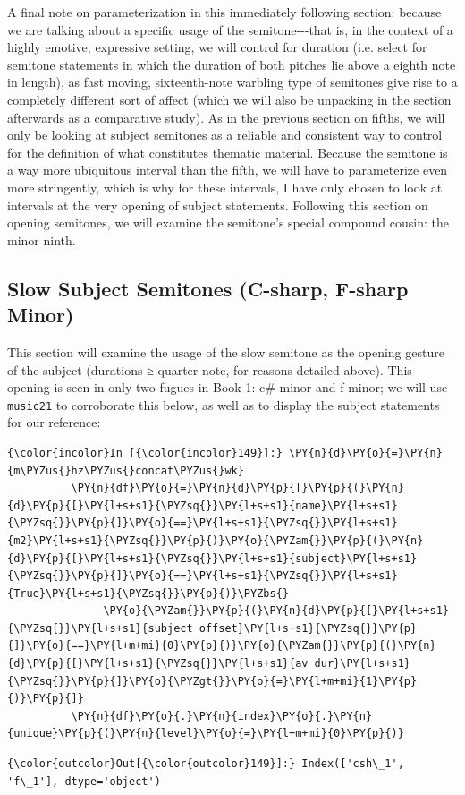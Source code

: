 A final note on parameterization in this immediately following section:
because we are talking about a specific usage of the semitone-\/-\/-that
is, in the context of a highly emotive, expressive setting, we will
control for duration (i.e. select for semitone statements in which the
duration of both pitches lie above a eighth note in length), as fast
moving, sixteenth-note warbling type of semitones give rise to a
completely different sort of affect (which we will also be unpacking in
the section afterwards as a comparative study). As in the previous
section on fifths, we will only be looking at subject semitones as a
reliable and consistent way to control for the definition of what
constitutes thematic material. Because the semitone is a way more
ubiquitous interval than the fifth, we will have to parameterize even
more stringently, which is why for these intervals, I have only chosen
to look at intervals at the very opening of subject statements.
Following this section on opening semitones, we will examine the
semitone's special compound cousin: the minor ninth.

    \subsection{Slow Subject Semitones (C-sharp, F-sharp
Minor)}\label{slow-subject-semitones-c-sharp-f-sharp-minor}

This section will examine the usage of the slow semitone as the opening
gesture of the subject (durations ≥ quarter note, for reasons detailed
above). This opening is seen in only two fugues in Book 1: c\# minor and
f minor; we will use \texttt{music21} to corroborate this below, as well
as to display the subject statements for our reference:

    \begin{Verbatim}[commandchars=\\\{\}]
{\color{incolor}In [{\color{incolor}149}]:} \PY{n}{d}\PY{o}{=}\PY{n}{m\PYZus{}hz\PYZus{}concat\PYZus{}wk}
          \PY{n}{df}\PY{o}{=}\PY{n}{d}\PY{p}{[}\PY{p}{(}\PY{n}{d}\PY{p}{[}\PY{l+s+s1}{\PYZsq{}}\PY{l+s+s1}{name}\PY{l+s+s1}{\PYZsq{}}\PY{p}{]}\PY{o}{==}\PY{l+s+s1}{\PYZsq{}}\PY{l+s+s1}{m2}\PY{l+s+s1}{\PYZsq{}}\PY{p}{)}\PY{o}{\PYZam{}}\PY{p}{(}\PY{n}{d}\PY{p}{[}\PY{l+s+s1}{\PYZsq{}}\PY{l+s+s1}{subject}\PY{l+s+s1}{\PYZsq{}}\PY{p}{]}\PY{o}{==}\PY{l+s+s1}{\PYZsq{}}\PY{l+s+s1}{True}\PY{l+s+s1}{\PYZsq{}}\PY{p}{)}\PYZbs{}
               \PY{o}{\PYZam{}}\PY{p}{(}\PY{n}{d}\PY{p}{[}\PY{l+s+s1}{\PYZsq{}}\PY{l+s+s1}{subject offset}\PY{l+s+s1}{\PYZsq{}}\PY{p}{]}\PY{o}{==}\PY{l+m+mi}{0}\PY{p}{)}\PY{o}{\PYZam{}}\PY{p}{(}\PY{n}{d}\PY{p}{[}\PY{l+s+s1}{\PYZsq{}}\PY{l+s+s1}{av dur}\PY{l+s+s1}{\PYZsq{}}\PY{p}{]}\PY{o}{\PYZgt{}}\PY{o}{=}\PY{l+m+mi}{1}\PY{p}{)}\PY{p}{]}
          \PY{n}{df}\PY{o}{.}\PY{n}{index}\PY{o}{.}\PY{n}{unique}\PY{p}{(}\PY{n}{level}\PY{o}{=}\PY{l+m+mi}{0}\PY{p}{)}
\end{Verbatim}
\begin{Verbatim}[commandchars=\\\{\}]
{\color{outcolor}Out[{\color{outcolor}149}]:} Index(['csh\_1', 'f\_1'], dtype='object')
\end{Verbatim}



